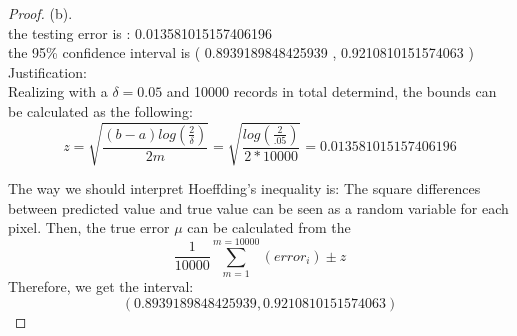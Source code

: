 \documentclass[12pt]{article}
\begin{document}
\begin{proof}
        (b).\\

        the testing error is : 0.013581015157406196\\
the 95\% confidence interval is ( 0.8939189848425939 , 0.9210810151574063 )\\
Justification: \\
Realizing with a $\delta=0.05$ and 10000 records in total determind, the bounds can be calculated as the following: \\
$$z= \sqrt{\frac{(b-a)log(\frac{2}{\delta})}{2m}} =  \sqrt{\frac{log(\frac{2}{.05})}{2*10000}} = 0.013581015157406196 $$

The way we should interpret Hoeffding’s inequality is: The square differences between predicted value and true value can be seen as a random variable for each pixel. Then, the true error $\mu$ can be calculated from the $$\frac{1}{10000}\sum_{m=1}^{m=10000} (error_i) \pm z$$
Therefore, we get the interval:\\ 
$$( 0.8939189848425939 , 0.9210810151574063 )$$
\end{proof}
\end{document}

